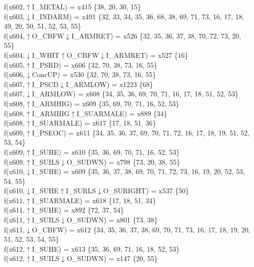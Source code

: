 f(x602,$\uparrow$I\_METAL) = x415 \{38, 20, 30, 15\} \\  
f(x603,$\downarrow$I\_INDARM) = x491 \{32, 33, 34, 35, 36, 68, 38, 69, 71, 73, 16, 17, 18, 49, 20, 50, 51, 52, 53, 55\} \\  
f(x604,$\uparrow$O\_CBFW$\downarrow$I\_ARMRET) = x526 \{32, 35, 36, 37, 38, 70, 72, 73, 20, 55\} \\  
f(x604,$\downarrow$I\_WHIT$\uparrow$O\_CBFW$\downarrow$I\_ARMRET) = x527 \{16\} \\  
f(x605,$\uparrow$I\_PSRD) = x606 \{32, 70, 38, 73, 16, 55\} \\  
f(x606,$\downarrow$ConcUP) = x530 \{32, 70, 38, 73, 16, 55\} \\  
f(x607,$\uparrow$I\_PSCD$\downarrow$I\_ARMLOW) = x1223 \{68\} \\  
f(x607,$\downarrow$I\_ARMLOW) = x608 \{34, 35, 36, 69, 70, 71, 16, 17, 18, 51, 52, 53\} \\  
f(x608,$\uparrow$I\_ARMHIG) = x609 \{35, 69, 70, 71, 16, 52, 53\} \\  
f(x608,$\uparrow$I\_ARMHIG$\uparrow$I\_SUARMALE) = x889 \{34\} \\  
f(x608,$\uparrow$I\_SUARMALE) = x617 \{17, 18, 51, 36\} \\  
f(x609,$\uparrow$I\_PSEOC) = x611 \{34, 35, 36, 37, 69, 70, 71, 72, 16, 17, 18, 19, 51, 52, 53, 54\} \\  
f(x609,$\uparrow$I\_SUHE) = x610 \{35, 36, 69, 70, 71, 16, 52, 53\} \\  
f(x609,$\uparrow$I\_SUILS$\downarrow$O\_SUDWN) = x798 \{73, 20, 38, 55\} \\  
f(x610,$\downarrow$I\_SUHE) = x609 \{35, 36, 37, 38, 69, 70, 71, 72, 73, 16, 19, 20, 52, 53, 54, 55\} \\  
f(x610,$\downarrow$I\_SUHE$\uparrow$I\_SURLS$\downarrow$O\_SURIGHT) = x537 \{50\} \\  
f(x611,$\uparrow$I\_SUARMALE) = x618 \{17, 18, 51, 34\} \\  
f(x611,$\uparrow$I\_SUHE) = x892 \{72, 37, 54\} \\  
f(x611,$\uparrow$I\_SUILS$\downarrow$O\_SUDWN) = x801 \{73, 38\} \\  
f(x611,$\downarrow$O\_CBFW) = x612 \{34, 35, 36, 37, 38, 69, 70, 71, 73, 16, 17, 18, 19, 20, 51, 52, 53, 54, 55\} \\  
f(x612,$\uparrow$I\_SUHE) = x613 \{35, 36, 69, 71, 16, 18, 52, 53\} \\  
f(x612,$\uparrow$I\_SUILS$\downarrow$O\_SUDWN) = x147 \{20, 55\} \\  
